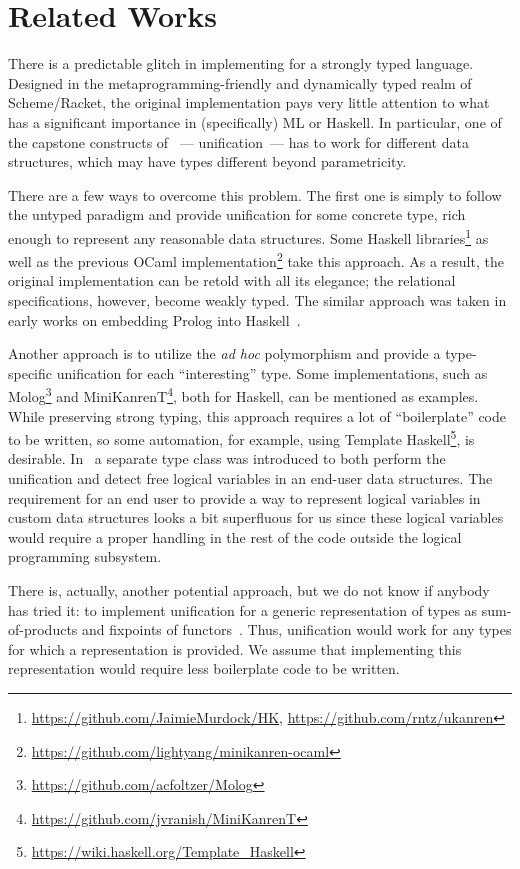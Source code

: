 \section{Related Works}
\label{sec:relworks}

There is a predictable glitch in implementing \miniKanren for a strongly typed language.
Designed in the metaprogramming-friendly and dynamically typed realm of Scheme/Racket, the original
\miniKanren implementation pays very little attention to what has a significant importance in (specifically)
ML or Haskell. In particular, one of the capstone constructs of \miniKanren~--- unification~--- has to work for
different data structures, which may have types different beyond parametricity.

There are a few ways to overcome this problem. The first one is simply to follow the untyped paradigm and
provide unification for some concrete type, rich enough to represent any reasonable data structures.
Some Haskell \miniKanren libraries\footnote{\url{https://github.com/JaimieMurdock/HK}, \url{https://github.com/rntz/ukanren}}
as well as the previous OCaml implementation\footnote{\url{https://github.com/lightyang/minikanren-ocaml}} take this approach.
As a result, the original implementation can be retold with all its elegance; the relational specifications, however,
become weakly typed. The similar approach was taken in early works on embedding Prolog into Haskell~\cite{PrologInHaskell}.

Another approach is to utilize the \emph{ad hoc} polymorphism and provide a type-specific unification for each ``interesting'' type.
Some \miniKanren implementations, such as Molog\footnote{\url{https://github.com/acfoltzer/Molog}} and
MiniKanrenT\footnote{\url{https://github.com/jvranish/MiniKanrenT}}, both for Haskell, can be mentioned as examples.
While preserving strong typing, this approach requires a lot of ``boilerplate''
code to be written, so some automation, for example, using Template Haskell\footnote{\url{https://wiki.haskell.org/Template_Haskell}},
is desirable. In~\cite{TypedLogicalVariables} a separate type class was introduced to both perform the unification
and detect free logical variables in an end-user data structures. The requirement for an end user to provide a way to represent
logical variables in custom data structures looks a bit superfluous for us since these logical variables would require a proper
handling in the rest of the code outside the logical programming subsystem.

There is, actually, another potential approach, but we do not know if anybody has tried
it: to implement unification for a generic representation of types as sum-of-products and fixpoints of
functors~\cite{InstantGenerics, ALaCarte}. Thus, unification would work for any types for which a representation
is provided. We assume that implementing this representation would require less boilerplate code to be written.

